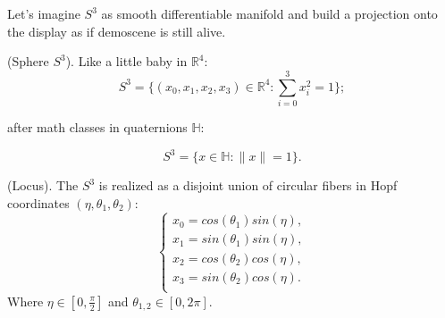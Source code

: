 Let's imagine $S^3$ as smooth differentiable manifold and build
a projection onto the display as if demoscene is still alive.

\begin{definition} (Sphere $S^3$).
Like a little baby in $\mathbb{R}^4$:
$$
S^3 = \{ (x_0,x_1,x_2,x_3) \in \mathbb{R}^4 : \sum_{i=0}^3 x_i^2 = 1 \};
$$
\end{definition}

after math classes in quaternions $\mathbb{H}$:

$$
S^3 = \{ x \in \mathbb{H} : \|x\| = 1 \}.
$$

\begin{definition} (Locus).
The $S^3$ is realized as a disjoint
union of circular fibers in Hopf coordinates $(\eta,\theta_1,\theta_2)$:
$$
\begin{cases}
x_0 = cos(\theta_1)sin(\eta), \\
x_1 = sin(\theta_1)sin(\eta), \\
x_2 = cos(\theta_2)cos(\eta), \\
x_3 = sin(\theta_2)cos(\eta). \\
\end{cases}
$$
Where $\eta \in [0,\frac{\pi}{2}]$ and $\theta_{1,2} \in [0,2\pi]$.
\end{definition}

